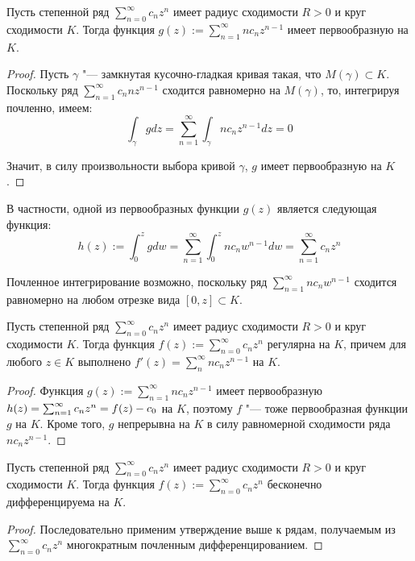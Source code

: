 \begin{corollary}
	Пусть степенной ряд $\sum_{n=0}^\infty c_nz^n$ имеет радиус сходимости $R > 0$ и круг сходимости $K$. Тогда функция $g(z) := \sum_{n = 1}^\infty nc_nz^{n-1}$ имеет первообразную на $K$.
\end{corollary}

\begin{proof}
	Пусть $\gamma$ "--- замкнутая кусочно-гладкая кривая такая, что $M(\gamma) \subset K$. Поскольку ряд $\sum_{n = 1}^\infty c_nnz^{n-1}$ сходится равномерно на $M(\gamma)$, то, интегрируя почленно, имеем:
	\[\int_\gamma gdz = \sum_{n = 1}^\infty \int_\gamma nc_nz^{n-1}dz = 0\]
	
	Значит, в силу произвольности выбора кривой $\gamma$, $g$ имеет первообразную на $K$.
\end{proof}

\begin{note}
	В частности, одной из первообразных функции $g(z)$ является следующая функция:
	\[h(z) := \int_0^zgdw = \sum_{n=1}^\infty \int_0^znc_nw^{n-1}dw = \sum_{n=1}^\infty c_nz^n\]
	
	Почленное интегрирование возможно, поскольку ряд $\sum_{n = 1}^\infty n c_nw^{n-1}$ сходится равномерно на любом отрезке вида $[0, z] \subset K$.
\end{note}

\begin{proposition}
	Пусть степенной ряд $\sum_{n=0}^\infty c_nz^n$ имеет радиус сходимости $R > 0$ и круг сходимости $K$. Тогда функция $f(z) := \sum_{n = 0}^\infty c_nz^{n}$ регулярна на $K$, причем для любого $z \in K$ выполнено $f'(z) = \sum_n^\infty nc_nz^{n-1}$ на $K$.
\end{proposition}

\begin{proof}
	Функция $g(z) := \sum_{n = 1}^\infty nc_nz^{n-1}$ имеет первообразную $h(z) = \sum_{n=1}^\infty c_nz^n \hm= f(z) - c_0$ на $K$, поэтому $f$ "--- тоже первообразная функции $g$ на $K$. Кроме того, $g$ непрерывна на $K$ в силу равномерной сходимости ряда $nc_nz^{n-1}$.
\end{proof}

\begin{corollary}
	Пусть степенной ряд $\sum_{n=0}^\infty c_nz^n$ имеет радиус сходимости $R > 0$ и круг сходимости $K$. Тогда функция $f(z) := \sum_{n = 0}^\infty c_nz^{n}$ бесконечно дифференцируема на $K$.
\end{corollary}

\begin{proof}
	Последовательно применим утверждение выше к рядам, получаемым из $\sum_{n=0}^\infty c_nz^n$ многократным почленным дифференцированием.
\end{proof}

